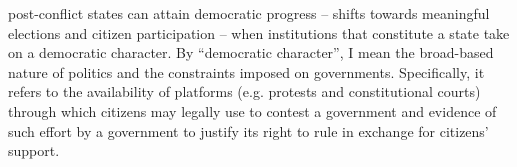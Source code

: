 \documentclass [11pt]{article}
\begin{document}




post-conflict states can attain democratic progress -- shifts towards meaningful elections and citizen participation -- when institutions that constitute a state take on a democratic character. By ``democratic character'', I mean the broad-based nature of politics and the constraints imposed on governments. Specifically, it refers to the availability of platforms (e.g. protests and constitutional courts) through which citizens may legally use to contest a government and evidence of such effort by a government to justify its right to rule in exchange for citizens' support.


\end{document}
